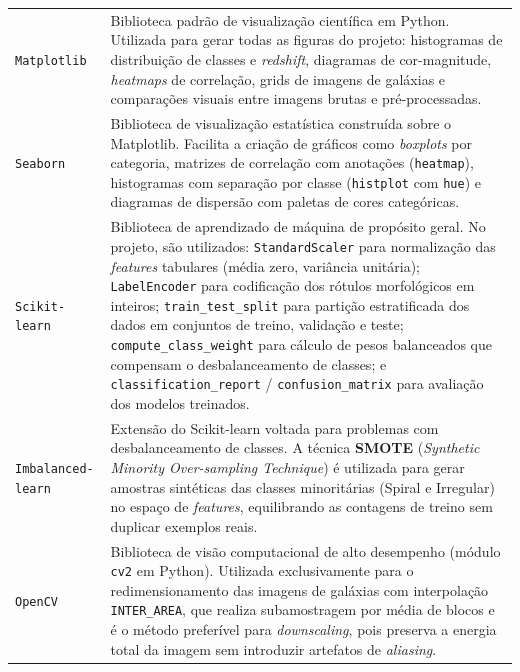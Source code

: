 \documentclass[12pt, a4paper]{article}
\begin{document}
\begin{longtable}{lp{10.5cm}}
  \texttt{Matplotlib}
  & Biblioteca padrão de visualização científica em Python. Utilizada
    para gerar todas as figuras do projeto: histogramas de distribuição
    de classes e \textit{redshift}, diagramas de cor-magnitude,
    \textit{heatmaps} de correlação, grids de imagens de galáxias e
    comparações visuais entre imagens brutas e pré-processadas. \\[6pt]

  \texttt{Seaborn}
  & Biblioteca de visualização estatística construída sobre o Matplotlib.
    Facilita a criação de gráficos como \textit{boxplots} por categoria,
    matrizes de correlação com anotações (\texttt{heatmap}), histogramas
    com separação por classe (\texttt{histplot} com \texttt{hue}) e
    diagramas de dispersão com paletas de cores categóricas. \\[6pt]

  \texttt{Scikit-learn}
  & Biblioteca de aprendizado de máquina de propósito geral. No projeto,
    são utilizados:
    \texttt{StandardScaler} para normalização das \textit{features}
    tabulares (média zero, variância unitária);
    \texttt{LabelEncoder} para codificação dos rótulos morfológicos em
    inteiros;
    \texttt{train\_test\_split} para partição estratificada dos dados em
    conjuntos de treino, validação e teste;
    \texttt{compute\_class\_weight} para cálculo de pesos balanceados
    que compensam o desbalanceamento de classes; e
    \texttt{classification\_report} / \texttt{confusion\_matrix} para
    avaliação dos modelos treinados. \\[6pt]

  \texttt{Imbalanced-learn}
  & Extensão do Scikit-learn voltada para problemas com desbalanceamento
    de classes. A técnica \textbf{SMOTE} (\textit{Synthetic Minority
    Over-sampling Technique}) é utilizada para gerar amostras sintéticas
    das classes minoritárias (Spiral e Irregular) no espaço de
    \textit{features}, equilibrando as contagens de treino sem duplicar
    exemplos reais. \\[6pt]

  \texttt{OpenCV}
  & Biblioteca de visão computacional de alto desempenho (módulo
    \texttt{cv2} em Python). Utilizada exclusivamente para o
    redimensionamento das imagens de galáxias com interpolação
    \texttt{INTER\_AREA}, que realiza subamostragem por média de blocos
    e é o método preferível para \textit{downscaling}, pois preserva a
    energia total da imagem sem introduzir artefatos de
    \textit{aliasing}. \\[6pt]


\end{longtable}
\end{document}
